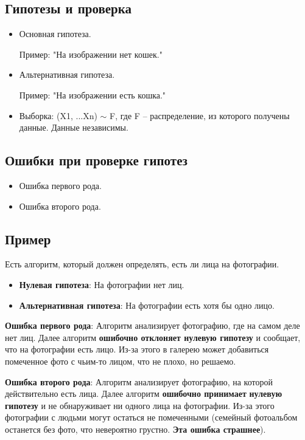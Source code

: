 \newpage

\subsection{Гипотезы и проверка}
\begin{itemize}
    \item Основная гипотеза.

          Пример: "На изображении нет кошек."

    \item Альтернативная гипотеза.

          Пример: "На изображении есть кошка."

    \item Выборка: (X1, ...Xn) \(\sim\) F, где F – распределение, из которого получены данные. Данные независимы.
\end{itemize}
\subsection*{Ошибки при проверке гипотез}
\begin{itemize}
    \item Ошибка первого рода.
    \item Ошибка второго рода.
\end{itemize}
\subsection*{Пример}
Есть алгоритм, который должен определять, есть ли лица на фотографии.
\begin{itemize}
    \item \textbf{Нулевая гипотеза}: На фотографии нет лиц.
    \item \textbf{Альтернативная гипотеза}: На фотографии есть хотя бы одно лицо.
\end{itemize}

\*

\textbf{Ошибка первого рода}: Алгоритм анализирует фотографию, где на
самом деле нет лиц. Далее алгоритм \textbf{ошибочно отклоняет нулевую гипотезу} и сообщает, что на фотографии есть лицо. Из-за этого в галерею может добавиться помеченное фото с чьим-то лицом, что не плохо, но решаемо.

\*

\textbf{Ошибка второго рода}: Алгоритм анализирует фотографию, на которой действительно есть лица. Далее алгоритм \textbf{ошибочно принимает} \textbf{нулевую гипотезу} и не обнаруживает ни одного лица на фотографии. Из-за этого фотографии с людьми могут остаться не помеченными (семейный фотоальбом останется без фото, что невероятно грустно. \textbf{Эта ошибка страшнее}).
